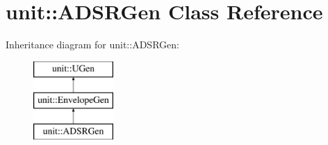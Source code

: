 \hypertarget{classunit_1_1ADSRGen}{}\section{unit\+:\+:A\+D\+S\+R\+Gen Class Reference}
\label{classunit_1_1ADSRGen}
Inheritance diagram for unit\+:\+:A\+D\+S\+R\+Gen\+:\begin{figure}[H]
\begin{center}
\leavevmode
\includegraphics[height=3.000000cm]{classunit_1_1ADSRGen}
\end{center}
\end{figure}
